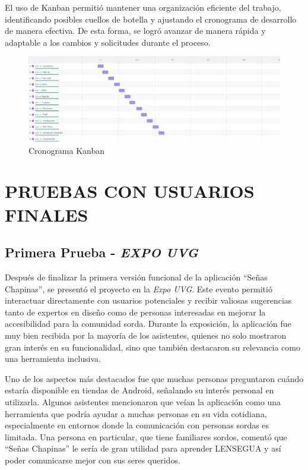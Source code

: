 El uso de Kanban permitió mantener una organización eficiente del trabajo, identificando posibles cuellos de botella y ajustando el cronograma de desarrollo de manera efectiva. De esta forma, se logró avanzar de manera rápida y adaptable a los cambios y solicitudes durante el proceso.

\begin{figure} [H]
    \centering
    \includegraphics[width=1\linewidth]{figuras/kanban.png}
    \caption{Cronograma Kanban}
    \label{fig:enter-label}
\end{figure}




\section{PRUEBAS CON USUARIOS FINALES}


\subsection{Primera Prueba - \textit{EXPO UVG}}

Después de finalizar la primera versión funcional de la aplicación ``Señas Chapinas'', se presentó el proyecto en la \textit{Expo UVG}. Este evento permitió interactuar directamente con usuarios potenciales y recibir valiosas sugerencias tanto de expertos en diseño como de personas interesadas en mejorar la accesibilidad para la comunidad sorda. Durante la exposición, la aplicación fue muy bien recibida por la mayoría de los asistentes, quienes no solo mostraron gran interés en su funcionalidad, sino que también destacaron su relevancia como una herramienta inclusiva.

Uno de los aspectos más destacados fue que muchas personas preguntaron cuándo estaría disponible en tiendas de Android, señalando su interés personal en utilizarla. Algunos asistentes mencionaron que veían la aplicación como una herramienta que podría ayudar a muchas personas en su vida cotidiana, especialmente en entornos donde la comunicación con personas sordas es limitada. Una persona en particular, que tiene familiares sordos, comentó que ``Señas Chapinas'' le sería de gran utilidad para aprender LENSEGUA y así poder comunicarse mejor con sus seres queridos.

